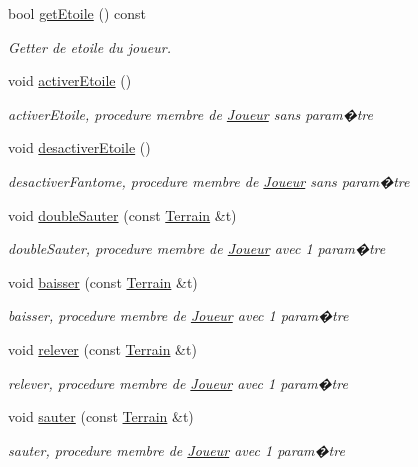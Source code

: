 \begin{DoxyCompactItemize}
bool \hyperlink{classJoueur_a6b3b101eb706defeb2b67d716eecf4d5}{get\+Etoile} () const
\begin{DoxyCompactList}\small\item\em Getter de etoile du joueur. \end{DoxyCompactList}\item 
void \hyperlink{classJoueur_abf3196f462694de76e7cda2a774e5fbd}{activer\+Etoile} ()
\begin{DoxyCompactList}\small\item\em activer\+Etoile, procedure membre de \hyperlink{classJoueur}{Joueur} sans param�tre \end{DoxyCompactList}\item 
void \hyperlink{classJoueur_a575fbcd1f18628c1f3b5b0892191a41e}{desactiver\+Etoile} ()
\begin{DoxyCompactList}\small\item\em desactiver\+Fantome, procedure membre de \hyperlink{classJoueur}{Joueur} sans param�tre \end{DoxyCompactList}\item 
void \hyperlink{classJoueur_aab0bbdf37652e97b1b1c050676f1e1e5}{double\+Sauter} (const \hyperlink{classTerrain}{Terrain} \&t)
\begin{DoxyCompactList}\small\item\em double\+Sauter, procedure membre de \hyperlink{classJoueur}{Joueur} avec 1 param�tre \end{DoxyCompactList}\item 
void \hyperlink{classJoueur_ae8ad5ac90f26c39a93c03e1b039729cf}{baisser} (const \hyperlink{classTerrain}{Terrain} \&t)
\begin{DoxyCompactList}\small\item\em baisser, procedure membre de \hyperlink{classJoueur}{Joueur} avec 1 param�tre \end{DoxyCompactList}\item 
void \hyperlink{classJoueur_a2280e97e2f7b686e9fe509b14fbbf261}{relever} (const \hyperlink{classTerrain}{Terrain} \&t)
\begin{DoxyCompactList}\small\item\em relever, procedure membre de \hyperlink{classJoueur}{Joueur} avec 1 param�tre \end{DoxyCompactList}\item 
void \hyperlink{classJoueur_a7299a7891687e5d67180e6375f56a2bb}{sauter} (const \hyperlink{classTerrain}{Terrain} \&t)
\begin{DoxyCompactList}\small\item\em sauter, procedure membre de \hyperlink{classJoueur}{Joueur} avec 1 param�tre \end{DoxyCompactList}\item 

\end{DoxyCompactItemize}
